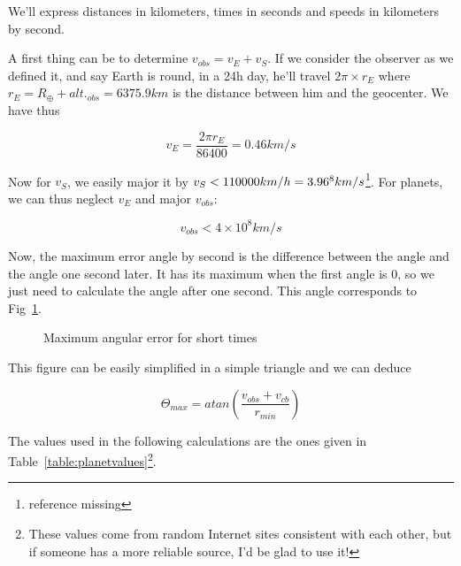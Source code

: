 We'll express distances in kilometers, times in seconds and speeds in kilometers by second.

A first thing can be to determine $v_{obs}=v_E+v_S$. If we consider the observer as we defined it, and say Earth is round, in a 24h day, he'll travel $2\pi\times r_{E}$ where $r_{E}=R_\oplus+alt._{obs}=6375.9km$ is the distance between him and the geocenter. We have thus 

\begin{equation}
v_E = \frac{2\pi r_E}{86400} = 0.46km/s
\end{equation}

Now for $v_S$, we easily major it by $v_S<110000km/h=3.96\time 10^8km/s$\footnote{reference missing}. For planets, we can thus neglect $v_E$ and major $v_{obs}$:

\begin{equation}
v_{obs} < 4\times 10^8km/s
\end{equation}

Now, the maximum error angle by second is the difference between the angle and the angle one second later. It has its maximum when the first angle is 0, so we just need to calculate the angle after one second. This angle corresponds to Fig~\ref{maxangularerror}.

\begin{figure}
\centering 
{}
\caption{Maximum angular error for short times}\label{maxangularerror}
\end{figure}

This figure can be easily simplified in a simple triangle and we can deduce 

\begin{equation}
\Theta_{max}=atan(\frac{v_{obs}+v_{cb}}{r_{min}})
\end{equation}

The values used in the following calculations are the ones given in Table~\ref{table:planetvalues}\footnote{These values come from random Internet sites consistent with each other, but if someone has a more reliable source, I'd be glad to use it!}.

